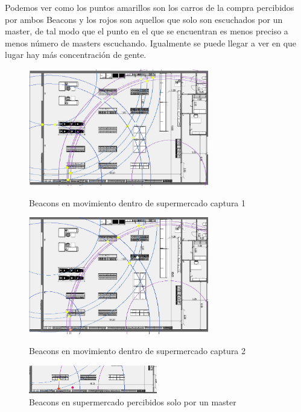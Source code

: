 \documentclass[paper=a4, fontsize=11pt,twoside]{scrartcl}
\begin{document}
        Podemos ver como los puntos amarillos son los carros de la compra percibidos por ambos Beacons y los rojos son aquellos
        que solo son escuchados por un master, de tal modo que el punto en el que se encuentran es menos preciso a menos número de 
        masters escuchando. Igualmente se puede llegar a ver en que lugar hay más concentración de gente.
        \begin{center}
            \begin{figure}[!ht]
                \centering
                \includegraphics[width=0.7\textwidth]{../../Memmory/images/agrupation_3.PNG}
                \caption{Beacons en movimiento dentro de supermercado captura 1}
                \includegraphics[width=0.7\textwidth]{../../Memmory/images/agrupation_2.PNG}
                \caption{Beacons en movimiento dentro de supermercado captura 2}
                \includegraphics[width=0.5\textwidth]{../../Memmory/images/agrupation_1.PNG}
                \caption{Beacons en supermercado percibidos solo por un master}
                \label{fig:mesh10}
            \end{figure}
        \end{center}   
        
\end{document}

